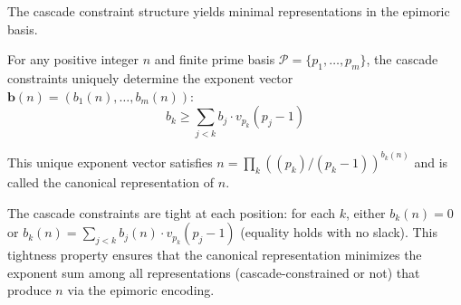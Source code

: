 The cascade constraint structure yields minimal representations in the epimoric basis.

\begin{theorem}
\label{thm:tight-cascade-constraints}

For any positive integer $n$ and finite prime basis $\mathcal{P} = \{p_1, \ldots, p_m\}$, the cascade constraints uniquely determine the exponent vector $\mathbf{b}(n) = (b_1(n), \ldots, b_m(n))$:
\begin{equation}
b_k \geq \sum_{j < k} b_j \cdot v_{p_k}(p_j - 1)
\end{equation}

This unique exponent vector satisfies $n = \prod_k ((p_k)/(p_k-1))^{b_k(n)}$ and is called the canonical representation of $n$.

The cascade constraints are tight at each position: for each $k$, either $b_k(n) = 0$ or $b_k(n) = \sum_{j < k} b_j(n) \cdot v_{p_k}(p_j - 1)$ (equality holds with no slack). This tightness property ensures that the canonical representation minimizes the exponent sum among all representations (cascade-constrained or not) that produce $n$ via the epimoric encoding.

\end{theorem}

